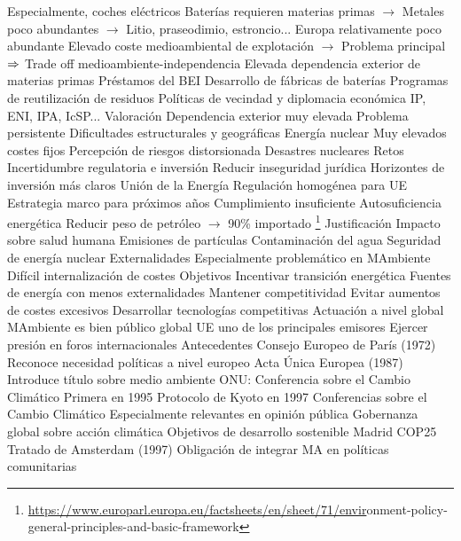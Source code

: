 \documentclass{nuevotema}
\begin{document}
\begin{esquemal}
				\4[] Especialmente, coches eléctricos
				\4[] Baterías requieren materias primas
				\4[] $\to$ Metales poco abundantes
				\4[] $\to$ Litio, praseodimio, estroncio...
				\4[] Europa relativamente poco abundante
				\4[] Elevado coste medioambiental de explotación
				\4[] $\to$ Problema principal
				\4[] $\Rightarrow$ Trade off medioambiente-independencia
				\4 Elevada dependencia exterior de materias primas
				\4 Préstamos del BEI
				\4[] Desarrollo de fábricas de baterías
				\4 Programas de reutilización de residuos
				\4 Políticas de vecindad y diplomacia económica
				\4[] IP, ENI, IPA, IcSP...
		\2 Valoración
			\3 Dependencia exterior muy elevada
				\4 Problema persistente
				\4 Dificultades estructurales y geográficas
			\3 Energía nuclear
				\4 Muy elevados costes fijos
				\4 Percepción de riesgos distorsionada
				\4[] Desastres nucleares
		\2 Retos
			\3 Incertidumbre regulatoria e inversión
				\4 Reducir inseguridad jurídica
				\4 Horizontes de inversión más claros
			\3 Unión de la Energía
				\4 Regulación homogénea para UE
				\4 Estrategia marco para próximos años
				\4 Cumplimiento insuficiente
			\3 Autosuficiencia energética
				\4 Reducir peso de petróleo
				\4[] $\to$ 90\% importado
	\1 \footnote{\url{https://www.europarl.europa.eu/factsheets/en/sheet/71/envir}onment-policy-general-principles-and-basic-framework}
		\2 Justificación
			\3 Impacto sobre salud humana
				\4 Emisiones de partículas
				\4 Contaminación del agua
				\4 Seguridad de energía nuclear
			\3 Externalidades
				\4 Especialmente problemático en MAmbiente
				\4 Difícil internalización de costes
		\2 Objetivos
			\3 Incentivar transición energética
				\4 Fuentes de energía con menos externalidades
			\3 Mantener competitividad
				\4 Evitar aumentos de costes excesivos
				\4 Desarrollar tecnologías competitivas
			\3 Actuación a nivel global
				\4 MAmbiente es bien público global
				\4 UE uno de los principales emisores
				\4 Ejercer presión en foros internacionales
		\2 Antecedentes
			\3 Consejo Europeo de París (1972)
				\4 Reconoce necesidad políticas a nivel europeo
			\3 Acta Única Europea (1987)
				\4 Introduce título sobre medio ambiente
			\3 ONU: Conferencia sobre el Cambio Climático
				\4 Primera en 1995
				\4 Protocolo de Kyoto en 1997
				\4 Conferencias sobre el Cambio Climático
				\4 Especialmente relevantes en opinión pública
				\4 Gobernanza global sobre acción climática
				\4 Objetivos de desarrollo sostenible
				\4 Madrid COP25
			\3 Tratado de Amsterdam (1997)
				\4 Obligación de integrar MA en políticas comunitarias

\end{esquemal}
\end{document}
